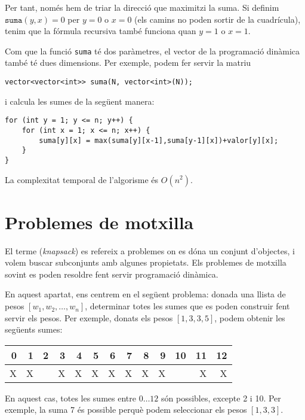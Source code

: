 Per tant, només hem de triar la direcció que maximitzi la suma.
Si definim $\texttt{suma}(y,x)=0$
per $y=0$ o $x=0$ (els camins no poden sortir de la cuadrícula),
tenim que la fórmula recursiva també funciona quan $y=1$ o $x=1$.

Com que la funció \texttt{suma} té dos paràmetres,
el vector de la programació dinàmica també té dues dimensions.
Per exemple, podem fer servir la matriu
\begin{lstlisting}
vector<vector<int>> suma(N, vector<int>(N));
\end{lstlisting}
i calcula les sumes de la següent manera:
\begin{lstlisting}
for (int y = 1; y <= n; y++) {
    for (int x = 1; x <= n; x++) {
        suma[y][x] = max(suma[y][x-1],suma[y-1][x])+valor[y][x];
    }
}
\end{lstlisting}
La complexitat temporal de l'algorisme és $O(n^2)$.

\section{Problemes de motxilla}


El terme  (\emph{knapsack}) es refereix a problemes on
es dóna un conjunt d'objectes, i volem
buscar subconjunts amb algunes propietats.
Els problemes de motxilla sovint es poden resoldre
fent servir programació dinàmica.

En aquest apartat, ens centrem en el següent
problema: donada una llista de pesos
$[w_1,w_2,\ldots,w_n]$,
determinar totes les 
sumes que es poden construir fent servir els pesos.
Per exemple, donats els pesos
$[1,3,3,5]$, podem obtenir les següents sumes:

\begin{center}
\begin{tabular}{rrrrrrrrrrrrr}
 0 & 1 & 2 & 3 & 4 & 5 & 6 & 7 & 8 & 9 & 10 & 11 & 12 \\
\hline
 X & X & & X & X & X & X & X & X & X & & X & X \\
\end{tabular}
\end{center}

En aquest cas, totes les sumes entre $0 \ldots 12$
són possibles, excepte 2 i 10.
Per exemple, la suma 7 és possible perquè
podem seleccionar els pesos $[1,3,3]$.

